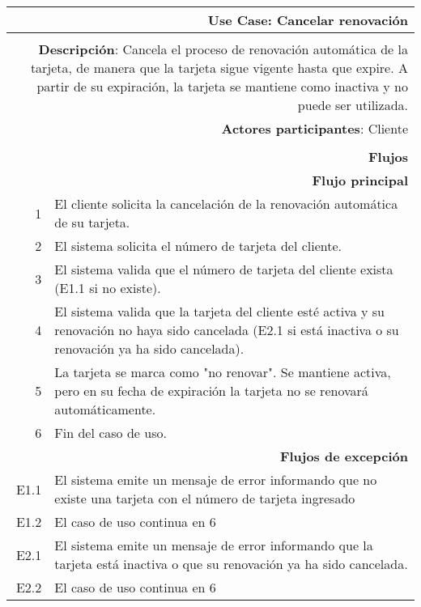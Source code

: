 \begin{tabularx}{\textwidth}{| r | X |}
\hline
\multicolumn{2}{|X|}{
\textbf{Use Case}: Cancelar renovación} \\

\hline
\multicolumn{2}{|c|}{\cellcolor[gray]{0.6}} \\

\hline
\multicolumn{2}{|X|}{
\textbf{Descripción}: Cancela el proceso de renovación automática de la tarjeta,
de manera que la tarjeta sigue vigente hasta que expire. A partir de su
expiración, la tarjeta se mantiene como inactiva y no puede ser utilizada.} \\

\hline
\multicolumn{2}{|X|}{
\textbf{Actores participantes}: Cliente} \\

\hline
\multicolumn{2}{|c|}{\cellcolor[gray]{0.6} } \\

\hline
\multicolumn{2}{|X|}{
\textbf{Flujos}} \\

\hline
\multicolumn{2}{|X|}{
\textbf{Flujo principal}} \\

\hline
1 & El cliente solicita la cancelación de la renovación automática de su
tarjeta. \\
\hline
2 & El sistema solicita el número de tarjeta del cliente. \\
\hline
3 & El sistema valida que el número de tarjeta del cliente exista (E1.1 si no
existe). \\
\hline
4 & El sistema valida que la tarjeta del cliente esté activa y su renovación no
haya sido cancelada (E2.1 si está inactiva o su renovación ya ha sido
cancelada). \\
\hline
5 & La tarjeta se marca como "no renovar". Se mantiene activa, pero en su fecha
de expiración la tarjeta no se renovará automáticamente. \\
\hline
6 & Fin del caso de uso. \\

\hline
\multicolumn{2}{|X|}{
\textbf{Flujos de excepción}} \\

\hline
E1.1 & El sistema emite un mensaje de error informando que no existe una tarjeta
con el número de tarjeta ingresado \\
\hline
E1.2 & El caso de uso continua en 6 \\

\hline
E2.1 & El sistema emite un mensaje de error informando que la tarjeta está
inactiva o que su renovación ya ha sido cancelada. \\
\hline
E2.2 & El caso de uso continua en 6 \\

\hline
\end{tabularx}

